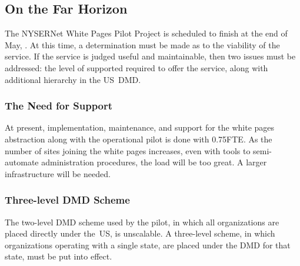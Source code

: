 \subsection	{On the Far Horizon}
The NYSERNet White Pages Pilot Project is scheduled to finish at the end of
May, {}.
At this time,
a determination must be made as to the viability of the service.
If the service is judged useful and maintainable,
then two issues must be addressed:
the level of supported required to offer the service,
along with additional hierarchy in the US~DMD.

\subsubsection	{The Need for Support}
At present,
implementation, maintenance, and support for the white pages abstraction along
with the operational pilot is done with 0.75FTE.
As the number of sites joining the white pages increases,
even with tools to semi-automate administration procedures,
the load will be too great.
A larger infrastructure will be needed.

\subsubsection	{Three-level DMD Scheme}
The two-level DMD scheme used by the pilot,
in which all organizations are placed directly under the~US,
is unscalable.
A three-level scheme,
in which organizations operating with a single state,
are placed under the DMD for that state,
must be put into effect.

\newpage
